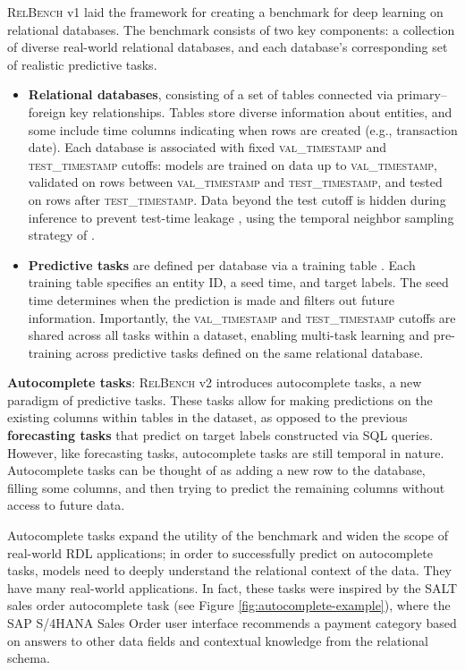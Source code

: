 \documentclass{article} %
\newcommand{\relbench}{\textsc{RelBench}\xspace}
\newcommand{\valtimestamp}{\textsc{val\_timestamp}\xspace}
\newcommand{\testtimestamp}{\textsc{test\_timestamp}\xspace}
\begin{document}
\relbench v1 \citep{relbench} laid the framework for creating a benchmark for deep learning
on relational databases. The benchmark consists of two key components: a collection of diverse real-world relational databases, and each database's corresponding set of realistic predictive tasks. 

\begin{itemize}[leftmargin=0.6cm,itemsep=3pt, parsep=0pt]
    \item \textbf{Relational databases}, consisting of a set of tables connected via primary–foreign key
    relationships. Tables store diverse information about entities, and some include time columns
    indicating when rows are created (e.g., transaction date). Each database is associated with fixed
    \valtimestamp and \testtimestamp cutoffs: models are trained on data up to \valtimestamp, validated
    on rows between \valtimestamp and \testtimestamp, and tested on rows after \testtimestamp. Data
    beyond the test cutoff is hidden during inference to prevent test-time leakage \citep{kapoor2023leakage},
    using the temporal neighbor sampling strategy of \citet{rdl}.

    \item \textbf{Predictive tasks} are defined per database via a training table \citep{rdl}. Each training
    table specifies an entity ID, a seed time, and target labels. The seed time determines when the
    prediction is made and filters out future information. Importantly, the \valtimestamp and
    \testtimestamp cutoffs are shared across all tasks within a dataset, enabling multi-task learning
    and pre-training across predictive tasks defined on the same relational database.
\end{itemize}

\textbf{Autocomplete tasks}: \relbench v2 introduces autocomplete tasks, a new paradigm of predictive tasks. These tasks allow for making predictions on the existing columns within tables in the dataset, as opposed to the previous \textbf{forecasting tasks} that predict on target labels constructed via SQL queries. However, like forecasting tasks, autocomplete tasks are still temporal in nature. Autocomplete tasks can be thought of as adding a new row to the database, filling some columns, and then trying to predict the remaining columns without access to future data.

Autocomplete tasks expand the utility of the benchmark and widen the scope of real-world RDL applications; in order to successfully predict on autocomplete tasks, models need to deeply understand the relational context of the data. They have many real-world applications. In fact, these tasks were inspired by the SALT \citep{sap-salt} sales order autocomplete task (see Figure \ref{fig:autocomplete-example}), where the SAP S/4HANA Sales Order user interface recommends a payment category based on answers to other data fields and contextual knowledge from the relational schema.
\end{document}
